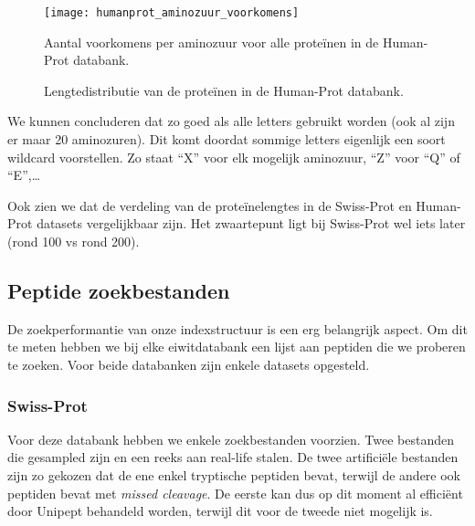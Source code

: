 \begin{figure}[H]
    \centering
    \texttt{[image: humanprot\_aminozuur\_voorkomens]}
    \caption{Aantal voorkomens per aminozuur voor alle proteïnen in de Human-Prot databank.}
    \label{fig:humanprot_aminozuur}
\end{figure}

\begin{figure}[H]
    \centering
    \hfill
    \caption{Lengtedistributie van de proteïnen in de Human-Prot databank.}\label{fig:humanprot_length}
\end{figure}

We kunnen concluderen dat zo goed als alle letters gebruikt worden (ook al zijn er maar 20 aminozuren).
Dit komt doordat sommige letters eigenlijk een soort wildcard voorstellen.
Zo staat ``X'' voor elk mogelijk aminozuur, ``Z'' voor ``Q'' of ``E'',\ldots

Ook zien we dat de verdeling van de proteïnelengtes in de Swiss-Prot en Human-Prot datasets vergelijkbaar zijn.
Het zwaartepunt ligt bij Swiss-Prot wel iets later (rond 100 vs rond 200).

\subsection{Peptide zoekbestanden}\label{subsec:peptide-zoek-bestanden}
De zoekperformantie van onze indexstructuur is een erg belangrijk aspect.
Om dit te meten hebben we bij elke eiwitdatabank een lijst aan peptiden die we proberen te zoeken.
Voor beide databanken zijn enkele datasets opgesteld.

\subsubsection{Swiss-Prot}
Voor deze databank hebben we enkele zoekbestanden voorzien.
Twee bestanden die gesampled zijn en een reeks aan real-life stalen.
De twee artificiële bestanden zijn zo gekozen dat de ene enkel tryptische peptiden bevat, terwijl de andere ook peptiden bevat met \textit{missed cleavage}.
De eerste kan dus op dit moment al efficiënt door Unipept behandeld worden, terwijl dit voor de tweede niet mogelijk is.

